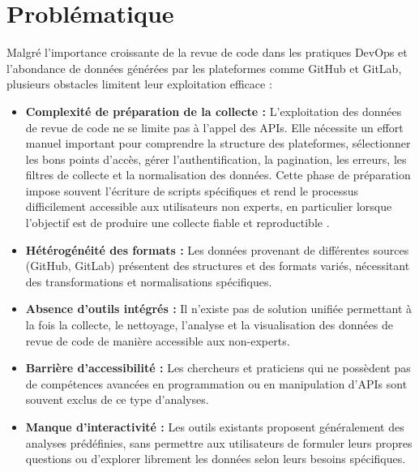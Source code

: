 \section{Problématique}

Malgré l'importance croissante de la revue de code dans les pratiques DevOps et l'abondance de données générées par les plateformes comme GitHub et GitLab, plusieurs obstacles limitent leur exploitation efficace :

\begin{itemize}
     \item \textbf{Complexité de préparation de la collecte :}
    L’exploitation des données de revue de code ne se limite pas à l’appel des APIs. Elle nécessite un effort manuel important pour comprendre la structure des plateformes, sélectionner les bons points d’accès, gérer l’authentification, la pagination, les erreurs, les filtres de collecte et la normalisation des données. Cette phase de préparation impose souvent l’écriture de scripts spécifiques et rend le processus difficilement accessible aux utilisateurs non experts, en particulier lorsque l’objectif est de produire une collecte fiable et reproductible \cite{gousios2012ghtorrent,duenas2018perceval,vidoni2022systematic}.
    
    \item \textbf{Hétérogénéité des formats :} Les données provenant de différentes sources (GitHub, GitLab) présentent des structures et des formats variés, nécessitant des transformations et normalisations spécifiques.
    
    \item \textbf{Absence d'outils intégrés :} Il n'existe pas de solution unifiée permettant à la fois la collecte, le nettoyage, l'analyse et la visualisation des données de revue de code de manière accessible aux non-experts.
    
    \item \textbf{Barrière d'accessibilité :} Les chercheurs et praticiens qui ne possèdent pas de compétences avancées en programmation ou en manipulation d'APIs sont souvent exclus de ce type d'analyses.
    
    \item \textbf{Manque d'interactivité :} Les outils existants proposent généralement des analyses prédéfinies, sans permettre aux utilisateurs de formuler leurs propres questions ou d'explorer librement les données selon leurs besoins spécifiques.
\end{itemize}

